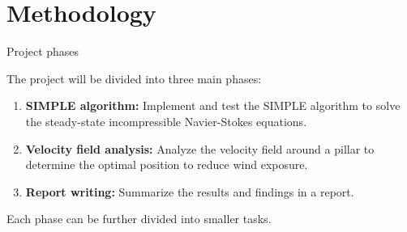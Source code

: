 \section{Methodology}

\begin{frame}{Project phases}

    The project will be divided into three main phases:

    \begin{enumerate}
        \item \textbf{SIMPLE algorithm:} Implement and test the SIMPLE algorithm to solve the steady-state incompressible Navier-Stokes equations.
        \item \textbf{Velocity field analysis:} Analyze the velocity field around a pillar to determine the optimal position to reduce wind exposure.
        \item \textbf{Report writing:} Summarize the results and findings in a report.
    \end{enumerate}

    Each phase can be further divided into smaller tasks.

\end{frame}



